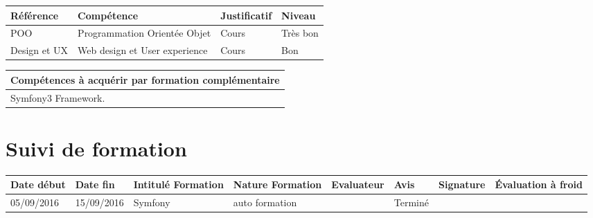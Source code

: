 \documentclass[11pt]{article}
\begin{document}
\centering
	\begin{longtable}{|p{}|p{}|p{}|p{}|}
	\hline
	\rowcolor{gray!40} Référence & Compétence & Justificatif & Niveau \\
	\hline
	 POO & Programmation Orientée Objet & Cours & Très bon \\
	 \hline
	 Design et UX & Web design et User experience & Cours & Bon \\
	 \hline
	\end{longtable}

\centering
	\begin{longtable}{|p{}|}
	\hline
	\rowcolor{gray!40} Compétences à acquérir par formation complémentaire \\
	\hline
	Symfony3 Framework.  \\
	\hline
	\end{longtable}

\section*{\large Suivi de formation}

\centering

	\begin{longtable}{|p{}|p{}|p{}|p{}|p{}|p{}|p{}|p{}|}
	
	\hline
	\rowcolor{gray!40} \tiny Date début & \tiny Date fin & \tiny Intitulé Formation & \tiny Nature Formation & \tiny Evaluateur & \tiny Avis & \tiny Signature & \tiny Évaluation à froid \\
	\hline
	05/09/2016 & 15/09/2016 & Symfony & auto formation & \Florian & Terminé & &  \\
	\hline
	\end{longtable}
\end{document}
